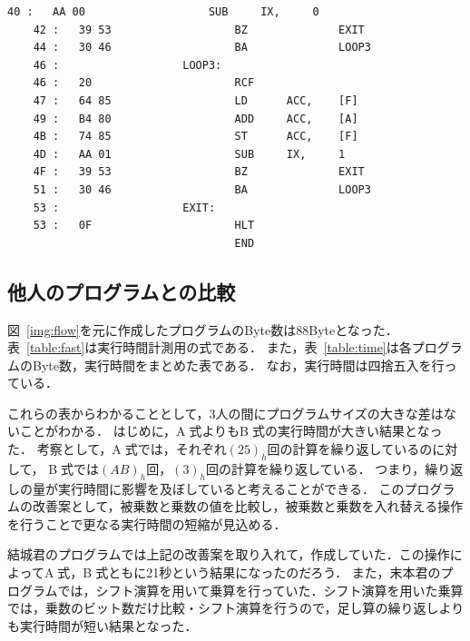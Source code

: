 \documentclass[dvipdfmx]{jsarticle}
\begin{document}
\begin{lstlisting}[caption=乗算を行うプログラムリスト, label=program]
    40 :   AA 00                   SUB     IX,     0
    42 :   39 53                   BZ              EXIT
    44 :   30 46                   BA              LOOP3
    46 :                   LOOP3:                  
    46 :   20                      RCF             
    47 :   64 85                   LD      ACC,    [F]
    49 :   B4 80                   ADD     ACC,    [A]
    4B :   74 85                   ST      ACC,    [F]
    4D :   AA 01                   SUB     IX,     1
    4F :   39 53                   BZ              EXIT
    51 :   30 46                   BA              LOOP3
    53 :                   EXIT:                   
    53 :   0F                      HLT             
                                   END
\end{lstlisting}

\subsection{他人のプログラムとの比較}
図~\ref{img:flow}を元に作成したプログラムのByte数は88Byteとなった．
表~\ref{table:fast}は実行時間計測用の式である．
また，表~\ref{table:time}は各プログラムのByte数，実行時間をまとめた表である．
なお，実行時間は四捨五入を行っている．

これらの表からわかることとして，3人の間にプログラムサイズの大きな差はないことがわかる．
はじめに，\textcircled{\scriptsize A}式よりも\textcircled{\scriptsize B}式の実行時間が大きい結果となった．
考察として，\textcircled{\scriptsize A}式では，それぞれ$(25)_{h}$回の計算を繰り返しているのに対して，
\textcircled{\scriptsize B}式では$(AB)_{h}$回，$(3)_{h}$回の計算を繰り返している．
つまり，繰り返しの量が実行時間に影響を及ぼしていると考えることができる．
このプログラムの改善案として，被乗数と乗数の値を比較し，被乗数と乗数を入れ替える操作を行うことで更なる実行時間の短縮が見込める．

結城君のプログラムでは上記の改善案を取り入れて，作成していた．この操作によって\textcircled{\scriptsize A}式，\textcircled{\scriptsize B}式ともに21秒という結果になったのだろう．
また，末本君のプログラムでは，シフト演算を用いて乗算を行っていた．シフト演算を用いた乗算では，乗数のビット数だけ比較・シフト演算を行うので，足し算の繰り返しよりも実行時間が短い結果となった．
\end{document}
